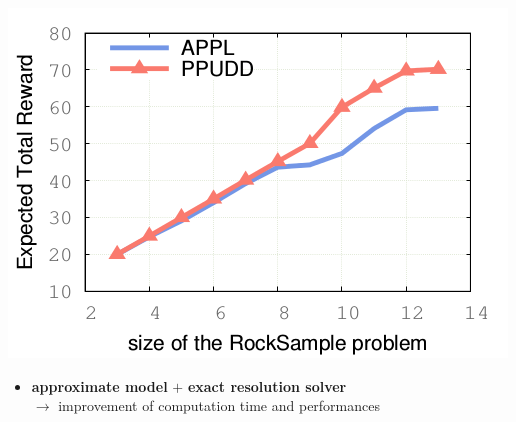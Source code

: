 \documentclass[12pt,svgnames,table]{beamer}
\begin{document}
\begin{frame}
{\begin{minipage}{0.43\linewidth}
	\vspace{-0.03cm}
	\includegraphics[scale=0.4]{courbePerfTime.png} 
	\end{minipage}

\vspace{-0.1cm}
\begin{alertblock}{}
\begin{itemize}
\item \textbf{approximate model} $+$ \textbf{exact resolution solver} \\
$\rightarrow$ improvement of computation time and performances
\end{itemize}
\end{alertblock}
}
\end{frame}
\end{document}
